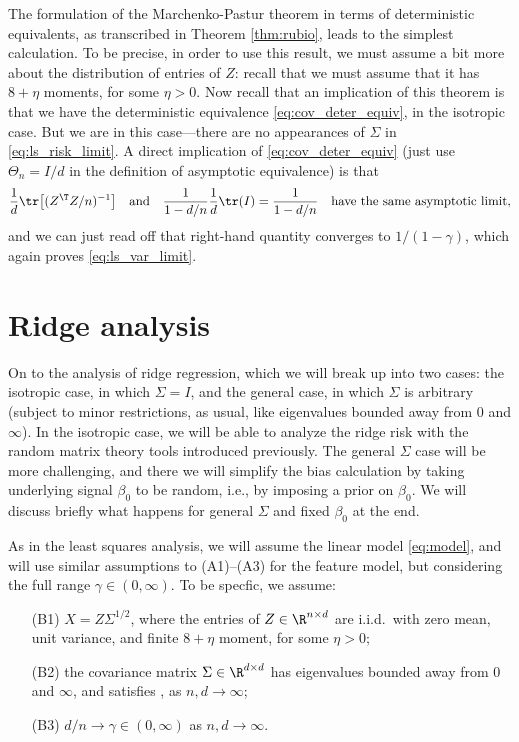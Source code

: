 \documentclass{article}
\begin{document}
The formulation of the Marchenko-Pastur theorem in terms of deterministic
equivalents, as transcribed in Theorem \ref{thm:rubio}, leads to the simplest
calculation. To be precise, in order to use this result, we must assume a bit
more about the distribution of entries of $Z$: recall that we must assume that
it has $8+\eta$ moments, for some $\eta>0$. Now recall that an implication of
this theorem is that we have the deterministic equivalence
\eqref{eq:cov_deter_equiv}, in the isotropic case. But we are in this
case---there are no appearances of $\Sigma$ in \eqref{eq:ls_risk_limit}.  A 
direct implication of \eqref{eq:cov_deter_equiv} (just use $\Theta_n = I/d$ in
the definition of asymptotic equivalence) is that   
\[
\frac{1}{d} \tr \big[ (Z^\T Z/n)^{-1} \big] \quad \text{and} \quad
\frac{1}{1-d/n} \frac{1}{d} \tr(I) = \frac{1}{1-d/n} \quad \text{have the same 
  asymptotic limit}, 
\]
and we can just read off that right-hand quantity converges to $1/(1-\gamma)$,
which again proves \eqref{eq:ls_var_limit}.   

\section{Ridge analysis}

On to the analysis of ridge regression, which we will break up into two cases:
the isotropic case, in which $\Sigma = I$, and the general case, in which
$\Sigma$ is arbitrary (subject to minor restrictions, as usual, like eigenvalues
bounded away from $0$ and $\infty$). In the isotropic case, we will be able to
analyze the ridge risk with the random matrix theory tools introduced
previously.  The general $\Sigma $ case will be more challenging, and there we 
will simplify the bias calculation by taking underlying signal $\beta_0$ to be
random, i.e., by imposing a prior on $\beta_0$. We will discuss briefly what
happens for general $\Sigma$ and fixed $\beta_0$ at the end.          

As in the least squares analysis, we will assume the linear model
\eqref{eq:model}, and will use similar assumptions to (A1)--(A3) for the feature   
model, but considering the full range $\gamma \in (0,\infty)$. To be specfic, we
assume:    
\begin{itemize}
\item[(B1)] $X = Z \Sigma^{1/2}$, where the entries of $Z \in \R^{n \times d}$
  are i.i.d.\ with zero mean, unit variance, and finite $8+\eta$ moment, for
  some $\eta>0$; 
\item[(B2)] the covariance matrix $\Sigma \in \R^{d \times d}$ has eigenvalues
  bounded away from $0$ and $\infty$, and satisfies ,
  as $n,d \to \infty$; 
\item[(B3)] $d/n \to \gamma \in (0,\infty)$ as $n,d \to \infty$.
\end{itemize}
\end{document}
